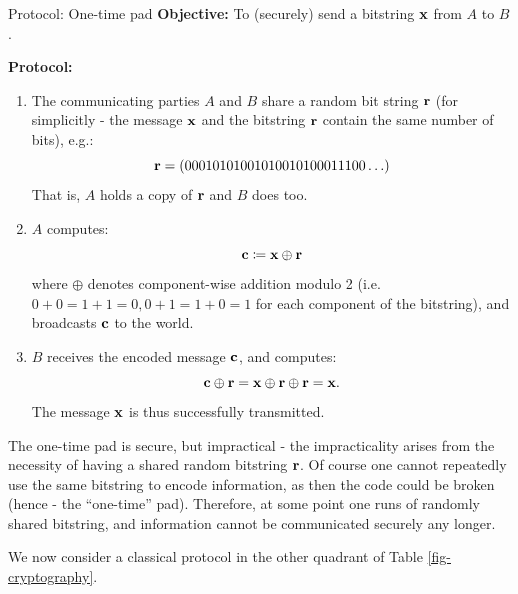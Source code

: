\begin{blankbox}{Protocol: One-time pad}
    \textbf{Objective:} To (securely) send a bitstring $\mathbf{x}$ from $A$ to $B$.

    \noindent
    \textbf{Protocol:}
    \begin{enumerate}
        \item The communicating parties $A$ and $B$ share a random bit string $\mathbf{r}$ (for simplicitly - the message $\mathbf{x}$ and the bitstring $\mathbf{r}$ contain the same number of bits), e.g.:
        \begin{equation}
            \mathbf{r} = (00010101001010010100011100\ldots)
        \end{equation}
        That is, $A$ holds a copy of $\mathbf{r}$ and $B$ does too.
        \item $A$ computes:
        \begin{equation}
            \mathbf{c} \coloneqq \mathbf{x} \oplus \mathbf{r}
        \end{equation}
        where $\oplus$ denotes component-wise addition modulo 2 (i.e. $0 + 0 = 1 + 1 = 0, 0 + 1 = 1 + 0 = 1$ for each component of the bitstring), and broadcasts $\mathbf{c}$ to the world.
        \item $B$ receives the encoded message $\mathbf{c}$, and computes:
        \begin{equation}
            \mathbf{c} \oplus \mathbf{r} = \mathbf{x} \oplus \mathbf{r} \oplus \mathbf{r} = \mathbf{x}.
        \end{equation}
        The message $\mathbf{x}$ is thus successfully transmitted.
    \end{enumerate}
\end{blankbox}
The one-time pad is secure, but impractical - the impracticality arises from the necessity of having a shared random bitstring $\mathbf{r}$. Of course one cannot repeatedly use the same bitstring to encode information, as then the code could be broken (hence - the ``one-time'' pad). Therefore, at some point one runs of randomly shared bitstring, and information cannot be communicated securely any longer.

We now consider a classical protocol in the other quadrant of Table \ref{fig-cryptography}.

